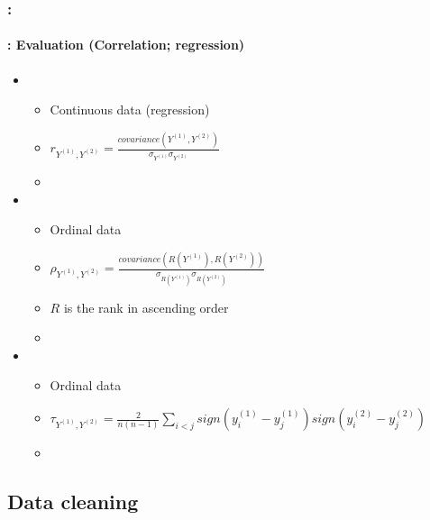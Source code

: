 \documentclass[xcolor=table]{beamer}
\begin{document}
\begin{frame}
	\frametitle{\insertshortsubtitle: \insertsection}
	\framesubtitle{\insertsubsection: Evaluation (Correlation; regression)}
	
	\begin{itemize}
		\item {}
		\begin{itemize}
			\item Continuous data (regression)
			\item $r_{Y^{(1)},Y^{(2)}} = \frac{covariance(Y^{(1)},Y^{(2)})}{\sigma_{Y^{(1)}} \sigma_{Y^{(2)}}}$
			\item {}
		\end{itemize}
		\item {}
		\begin{itemize}
			\item Ordinal data
			\item $\rho_{Y^{(1)},Y^{(2)}} = \frac{covariance(R(Y^{(1)}),R(Y^{(2)}))}{\sigma_{R(Y^{(1)})} \sigma_{R(Y^{(2)})}}$
			\item $R$ is the rank in ascending order
			\item {}
		\end{itemize}
		\item {}
		\begin{itemize}
			\item Ordinal data
			\item $\tau_{Y^{(1)},Y^{(2)}} = \frac{2}{n (n-1)} \sum_{i<j} sign(y^{(1)}_i - y^{(1)}_j) sign(y^{(2)}_i - y^{(2)}_j)$
			\item {}
		\end{itemize}
	\end{itemize}
	
\end{frame}

\subsection{Data cleaning}
\end{document}
